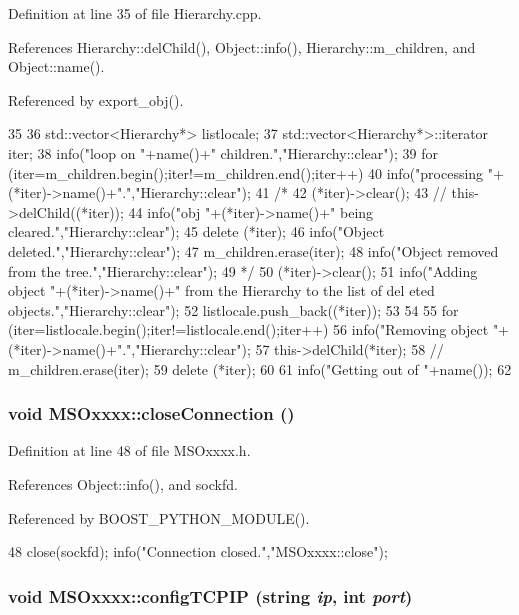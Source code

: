 Definition at line 35 of file Hierarchy.cpp.

References Hierarchy::delChild(), Object::info(), Hierarchy::m\_\-children, and Object::name().

Referenced by export\_\-obj().


\begin{DoxyCode}
35                      {
36   std::vector<Hierarchy*> listlocale;
37   std::vector<Hierarchy*>::iterator iter;
38   info("loop on "+name()+" children.","Hierarchy::clear");
39   for (iter=m_children.begin();iter!=m_children.end();iter++){
40       info("processing "+(*iter)->name()+".","Hierarchy::clear");
41 /*
42       (*iter)->clear();
43 //      this->delChild((*iter));
44       info("obj "+(*iter)->name()+" being cleared.","Hierarchy::clear");
45       delete (*iter);
46       info("Object deleted.","Hierarchy::clear");
47       m_children.erase(iter);
48       info("Object removed from the tree.","Hierarchy::clear");
49 */
50     (*iter)->clear();
51     info("Adding object "+(*iter)->name()+" from the Hierarchy to the list of del
      eted objects.","Hierarchy::clear");
52     listlocale.push_back((*iter));
53   }
54 
55   for (iter=listlocale.begin();iter!=listlocale.end();iter++){
56     info("Removing object "+(*iter)->name()+".","Hierarchy::clear");
57     this->delChild(*iter);
58 //    m_children.erase(iter);
59     delete (*iter);
60   }
61   info("Getting out of "+name());
62 }
\end{DoxyCode}
\hypertarget{classMSOxxxx_a65fd9540df836c24a044807f12071c92}{
\subsubsection[{closeConnection}]{\setlength{\rightskip}{0pt plus 5cm}void MSOxxxx::closeConnection ()}}
\label{classMSOxxxx_a65fd9540df836c24a044807f12071c92}


Definition at line 48 of file MSOxxxx.h.

References Object::info(), and sockfd.

Referenced by BOOST\_\-PYTHON\_\-MODULE().


\begin{DoxyCode}
48 {   close(sockfd);  info("Connection closed.","MSOxxxx::close");    }
\end{DoxyCode}
\hypertarget{classMSOxxxx_a3fc4e785c764c2abb0c0c2da4d71108a}{
\subsubsection[{configTCPIP}]{\setlength{\rightskip}{0pt plus 5cm}void MSOxxxx::configTCPIP (string {\em ip}, \/  int {\em port})}}
\label{classMSOxxxx_a3fc4e785c764c2abb0c0c2da4d71108a}


